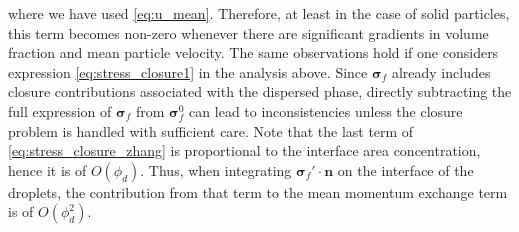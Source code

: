 where we have used \ref{eq:u_mean}.
Therefore, at least in the case of solid particles, this term becomes non-zero whenever there are significant gradients in volume fraction and mean particle velocity. %
The same observations hold if one considers expression \ref{eq:stress_closure1} in the analysis above. 
Since $\bm\sigma_f$ already includes closure contributions associated with the dispersed phase, directly subtracting the full expression of $\bm\sigma_f$ from $\bm\sigma_f^0$ can lead to inconsistencies unless the closure problem is handled with sufficient care. 
Note that the last term of \ref{eq:stress_closure_zhang} is proportional to the interface area concentration, hence it is of $O(\phi_d)$.
Thus, when integrating $\bm\sigma_f'\cdot \textbf{n}$ on the interface of the droplets, the contribution from that term to the mean momentum exchange term is of $O(\phi_d^2)$. 


